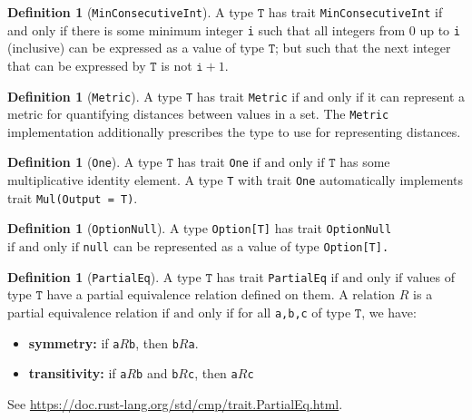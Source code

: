 \documentclass[11pt,a4paper]{article}
\theoremstyle{definition}
\newtheorem{definition}[theorem]{Definition}
\newcommand{\inRust}[2]{See \url{#2}.}
\newcommand{\T}{\texttt{T}}
\newcommand{\iffText}{\text{if and only if}}
\begin{document}
\begin{definition}[\texttt{MinConsecutiveInt}]
A type $\T$ has trait \texttt{MinConsecutiveInt} if and only if there is some minimum integer \texttt{i} such that all integers from 0 up to \texttt{i} (inclusive) can be expressed as a value of type $\T$; but such that the next integer that can be expressed by $\T$ is not $\texttt{i}+1$.
\end{definition}

\begin{definition}[\texttt{Metric}]
A type \texttt{T} has trait \texttt{Metric} $\iffText$ it can represent a metric for quantifying distances between values in a set. The \texttt{Metric} implementation additionally prescribes the type to use for representing distances.
\end{definition}

\begin{definition}[\texttt{One}]
    A type $\T$ has trait \texttt{One} $\iffText$ $\T$ has some multiplicative identity element. A type \texttt{T} with trait \texttt{One} automatically implements trait \texttt{Mul(Output = T)}.
\end{definition}

\begin{definition}[\texttt{OptionNull}]
A type \texttt{Option[T]} has trait \texttt{OptionNull} $\iffText$ \texttt{null} can be represented as a value of type \texttt{Option[T].}
\end{definition}


\begin{definition}[\texttt{PartialEq}]
    A type $\T$ has trait \texttt{PartialEq} $\iffText$ values of type $\T$ have a partial equivalence relation defined on them. A relation $R$ is a partial equivalence relation $\iffText$ for all \texttt{a,b,c} of type $\T$, we have:
    \begin{itemize}
        \item \textbf{symmetry:} if \texttt{a}$R$\texttt{b}, then \texttt{b}$R$\texttt{a}.
        \item \textbf{transitivity:} if \texttt{a}$R$\texttt{b} and \texttt{b}$R$\texttt{c}, then \texttt{a}$R$\texttt{c}
    \end{itemize}
    
    \inRust{Trait std::cmp::PartialEq}{https://doc.rust-lang.org/std/cmp/trait.PartialEq.html}
\end{definition}
\end{document}
